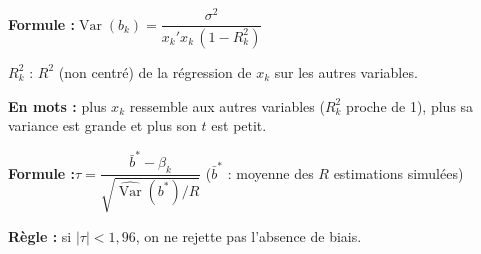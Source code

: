 \documentclass[12pt,a4paper]{article}
\newcommand{\Var}{\operatorname{Var}}\newcommand{\Cov}{\operatorname{Cov}}
\begin{document}
\begin{outil}[title={Multicolinéarité : pourquoi la variance augmente}]
\textbf{Formule :}\quad $\Var(b_k)=\dfrac{\sigma^2}{x_k'x_k\,(1-R_k^2)}$

$R_k^2$ : $R^2$ (non centré) de la régression de $x_k$ sur les autres variables.

\textbf{En mots :} plus $x_k$ ressemble aux autres variables ($R_k^2$ proche de 1), plus sa variance est grande et plus son $t$ est petit.
\end{outil}

\begin{outil}[title={Après un Monte Carlo : l'estimateur est-il sans biais ?}]
\textbf{Formule :}\quad $\tau=\dfrac{\bar b^*-\beta_k}{\sqrt{\widehat{\Var}(b^*)/R}}$ \quad ($\bar b^*$ : moyenne des $R$ estimations simulées)

\textbf{Règle :} si $|\tau|<1{,}96$, on ne rejette pas l'absence de biais.
\end{outil}
\end{document}

